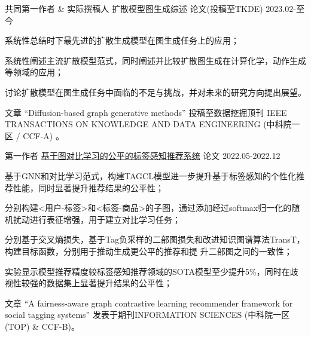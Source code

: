 \begin{cventries}
\cventry
{共同第一作者 \& 实际撰稿人} %
{扩散模型图生成综述} %
{论文(投稿至TKDE)} %
{2023.02-至今} %
{
  \begin{cvitems} 
    \item {系统性总结时下最先进的扩散生成模型在图生成任务上的应用；}
    \item {系统性阐述主流扩散模型范式，同时阐述并比较扩散图生成在计算化学，动作生成等领域的应用；}
    \item {讨论扩散模型在图生成任务中面临的不足与挑战，并对未来的研究方向提出展望。}
    \item {文章 “Diffusion-based graph generative methods” 投稿至数据挖掘顶刊 IEEE TRANSACTIONS ON KNOWLEDGE AND DATA ENGINEERING (中科院一区 / CCF-A) 。}
\end{cvitems}
}


\cventry
{第一作者} %
{\href{https://www.sciencedirect.com/science/article/pii/S0020025523006497}{基于图对比学习的公平的标签感知推荐系统}} %
{论文} %
{2022.05-2022.12} %
{
  \begin{cvitems} %
    \item {基于GNN和对比学习范式，构建TAGCL模型进一步提升基于标签感知的个性化推荐性能，同时显著提升推荐结果的公平性；}
    \item {分别构建<用户-标签>和<标签-商品>的子图，通过添加经过softmax归一化的随机扰动进行表征增强，用于建立对比学习任务；}
    \item {分别基于交叉熵损失，基于Tag负采样的二部图损失和改进知识图谱算法TransT，构建目标函数，分别用于推动生成更公平的推荐和提
    升二部图之间的一致性；}
    \item {实验显示模型推荐精度较标签感知推荐领域的SOTA模型至少提升5\%，同时在歧视性较强的数据集上显著提升结果的公平性；}
    \item {文章 “A fairness-aware graph contrastive learning recommender framework for social tagging systems” 发表于期刊INFORMATION SCIENCES (中科院一区(TOP) \& CCF-B)。}   
  \end{cvitems}
}


\end{cventries}
